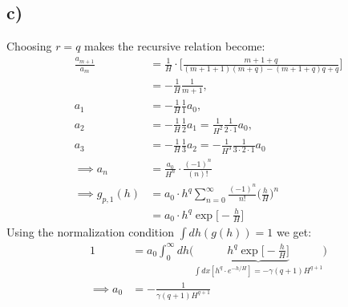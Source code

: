 \documentclass{article}
\begin{document}
\subsection*{c)}
Choosing $r = q$ makes the recursive relation become:
\begin{align*}
    \frac{a_{m+1}}{a_m}&=\frac{1}{H}\cdot\Bigg[\frac{m+1 + q}{(m+1+1)(m+q)-(m+1+q)q + q}\Bigg]\\
    &=-\frac{1}{H}\frac{1}{m+1},\\
    a_1 &= -\frac{1}{H}\frac{1}{1}a_0,\\
    a_2 &= -\frac{1}{H}\frac{1}{2}a_1 = \frac{1}{H^2}\frac{1}{2\cdot 1}a_0,\\
    a_3 &= -\frac{1}{H}\frac{1}{3}a_2 = -\frac{1}{H^3}\frac{1}{3\cdot2\cdot1}a_0\\
    \implies a_n &= \frac{a_0}{H^{n}} \cdot \frac{(-1)^{n}}{(n)!}\\
    \implies g_{p,1}(h)&= a_0\cdot h^q\sum_{n=0}^\infty\frac{(-1)^{n}}{n!}\Bigg(\frac{h}{H}\Bigg)^n\\
    &=a_0\cdot h^q\exp\Big[-\frac{h}{H}\Big]
\end{align*}Using the normalization condition $\int dh(g(h)) = 1$ we get:
\begin{align*}
    1&=a_0\int_0^\infty dh \Bigg(\underbrace{h^{q} \exp\Big[-\frac{h}{H}\Big]}_{\int dx[ h^{q}\cdot e^{-h/H}] = -\gamma(q+1)H^{q+1}}\Bigg)\\
    \implies a_0 &=-\frac{1}{\gamma(q+1)H^{q+1}}
\end{align*}
\end{document}
